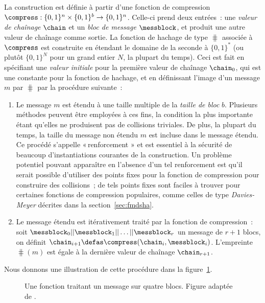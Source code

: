 La construction \merkdam est définie à partir d'une fonction de compression
$\compress : \{0,1\}^n \times \{0,1\}^b \rightarrow \{0,1\}^n$. Celle-ci
prend deux entrées~: une \emph{valeur de chaînage} $\chain$ et un \emph{bloc de message} $\messblock$, et produit une autre valeur de chaînage comme sortie.
La fonction de hachage de type \merkdam
$\hash$ associée à $\compress$ est construite en étendant le domaine de la seconde à $\{0,1\}^*$ (ou plutôt $\{0,1\}^N$ pour un grand entier $N$, la plupart du temps).
Ceci est fait en spécifiant une \emph{valeur initiale} \iv pour la première valeur de chaînage
$\chain_0$, qui est une constante pour la fonction de hachage, et en définissant l'image d'un message
$m$ par $\hash$ par la procédure suivante~:
\begin{enumerate}
\item Le message $m$ est étendu
à une taille multiple de la \emph{taille de bloc} $b$. Plusieurs méthodes peuvent être employées à ces fins, la condition la plus importante étant
qu'elles ne produisent pas de collisions triviales. De plus, la plupart du temps, la taille du message non étendu
$m$ est incluse dans le message étendu. Ce procédé s'appelle «\,renforcement \merkdam» et est essentiel
à la sécurité de beaucoup d'instantiations courantes de la construction. Un problème potentiel pouvant
apparaître en l'absence d'un tel renforcement est qu'il serait possible d'utiliser des points fixes pour la fonction de compression pour
construire des collisions~; de tels points fixes sont faciles à trouver pour certaines fonctions de compression populaires, comme celles de type
\emph{Davies-Meyer} décrites dans la section~\ref{sec:fmdsha}.
\item Le message étendu est itérativement traité par la fonction de compression~: soit
$\messblock_0||\messblock_1||\ldots||\messblock_r$ un message de
$r+1$ blocs, on définit $\chain_{i+1} \defas \compress(\chain_i, \messblock_i)$. L'empreinte $\hash(m)$ est égale à la dernière valeur de chaînage
$\chain_{r+1}$.
\end{enumerate}

Nous donnons une illustration de cette procédure dans la figure~\ref{fig:fmerk}.

\begin{figure}[!htb]
\begin{center}

\caption[Une fonction \merkdam traitant un message sur quatre blocs.]{Une fonction \merkdam traitant un message sur quatre blocs. Figure adaptée de \cite{TiKZ:Cryptographers}.\label{fig:fmerk}}
\end{center}
\end{figure}

